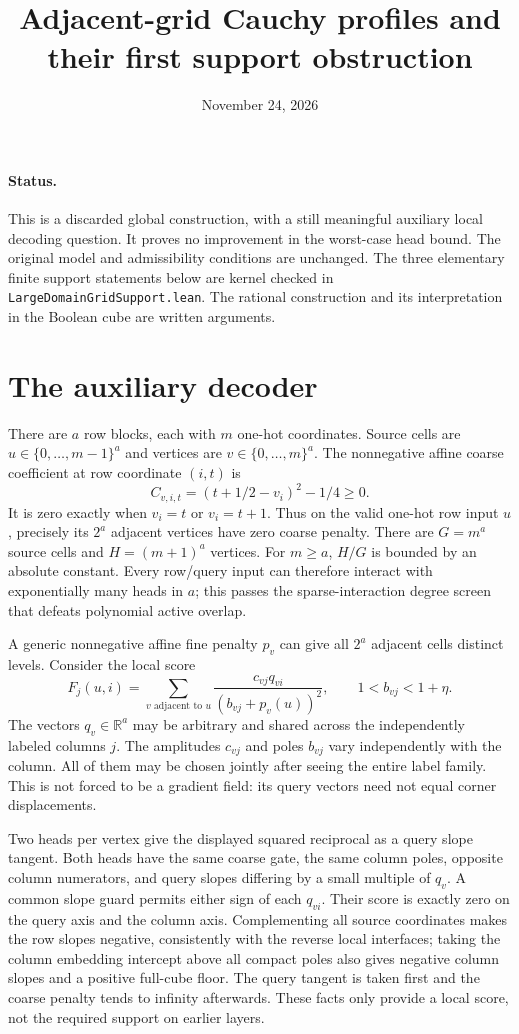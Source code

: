 \documentclass[11pt]{article}
\begin{document}
\title{Adjacent-grid Cauchy profiles and their first support obstruction}
\date{November 24, 2026}
\maketitle

\paragraph{Status.}
This is a discarded global construction, with a still meaningful auxiliary
local decoding question. It proves no improvement in the worst-case head
bound. The original model and admissibility conditions are unchanged.
The three elementary finite support statements below are kernel checked
in \texttt{LargeDomainGridSupport.lean}. The rational construction and its
interpretation in the Boolean cube are written arguments.

\section{The auxiliary decoder}
There are $a$ row blocks, each with $m$ one-hot coordinates. Source cells
are $u\in\{0,\ldots,m-1\}^a$ and vertices are
$v\in\{0,\ldots,m\}^a$. The nonnegative affine coarse coefficient at
row coordinate $(i,t)$ is
\[
 C_{v,i,t}=(t+1/2-v_i)^2-1/4\geq0.
\]
It is zero exactly when $v_i=t$ or $v_i=t+1$. Thus on the valid one-hot
row input $u$, precisely its $2^a$ adjacent vertices have zero coarse
penalty. There are $G=m^a$ source cells and $H=(m+1)^a$ vertices. For
$m\geq a$, $H/G$ is bounded by an absolute constant. Every row/query
input can therefore interact with exponentially many heads in $a$;
this passes the sparse-interaction degree screen that defeats polynomial
active overlap.

A generic nonnegative affine fine penalty $p_v$ can give all $2^a$
adjacent cells distinct levels. Consider the local score
\[
 F_j(u,i)=\sum_{v\text{ adjacent to }u}
 \frac{c_{vj}q_{vi}}{(b_{vj}+p_v(u))^2},
 \qquad 1<b_{vj}<1+\eta.
\]
The vectors $q_v\in\mathbb R^a$ may be arbitrary and shared across the
independently labeled columns $j$. The amplitudes $c_{vj}$ and poles
$b_{vj}$ vary independently with the column. All of them may be chosen
jointly after seeing the entire label family. This is not forced to be a
gradient field: its query vectors need not equal corner displacements.

Two heads per vertex give the displayed squared reciprocal as a query
slope tangent. Both heads have the same coarse gate, the same column
poles, opposite column numerators, and query slopes differing by a small
multiple of $q_v$. A common slope guard permits either sign of each
$q_{vi}$. Their score is exactly zero on the query axis and the column
axis. Complementing all source coordinates makes the row slopes
negative, consistently with the reverse local interfaces; taking the
column embedding intercept above all compact poles also gives negative
column slopes and a positive full-cube floor. The query tangent is taken
first and the coarse penalty tends to infinity afterwards. These facts
only provide a local score, not the required support on earlier layers.
\end{document}
